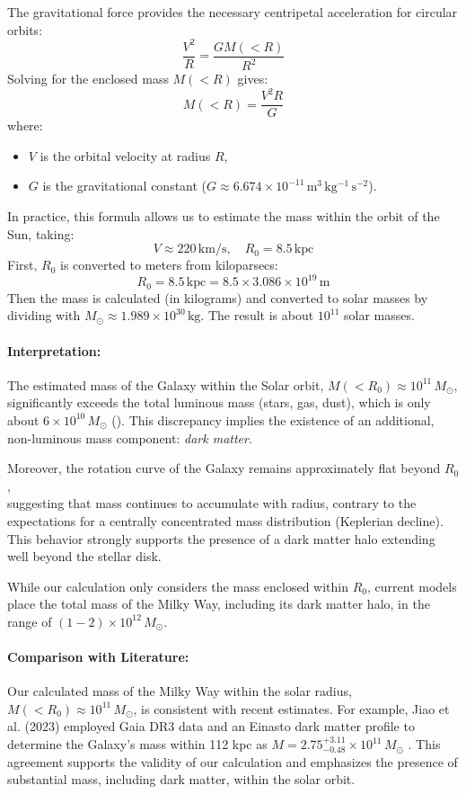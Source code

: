 \documentclass[12pt,a4paper]{article}
\begin{document}
The gravitational force provides the necessary centripetal acceleration for circular orbits:
\[
\frac{V^2}{R} = \frac{GM(<R)}{R^2}
\]
Solving for the enclosed mass $M(<R)$ gives:
\[
M(<R) = \frac{V^2 R}{G}
\]
where:
\begin{itemize}
  \item $V$ is the orbital velocity at radius $R$,
  \item $G$ is the gravitational constant ($G \approx 6.674 \times 10^{-11}\,\mathrm{m^3\,kg^{-1}\,s^{-2}}$).
\end{itemize}

In practice, this formula allows us to estimate the mass within the orbit of the Sun, taking:
\[
V \approx 220\,\mathrm{km/s}, \quad R_0 = 8.5\,\mathrm{kpc}
\]
First, $R_0$ is converted to meters from kiloparsecs:
\[
R_0 = 8.5\,\mathrm{kpc} = 8.5 \times 3.086 \times 10^{19}\,\mathrm{m}
\]
Then the mass is calculated (in kilograms) and converted to solar masses by dividing with $M_\odot \approx 1.989 \times 10^{30}\,\mathrm{kg}$. The result is about $10^{11}$ solar masses.

\paragraph{Interpretation:}
The estimated mass of the Galaxy within the Solar orbit, $M(<R_0) \approx 10^{11}\,M_\odot$, significantly exceeds the total luminous mass (stars, gas, dust), which is only about $6 \times 10^{10}\,M_\odot$ (\cite{lum_mass}). This discrepancy implies the existence of an additional, non-luminous mass component: \emph{dark matter}.

Moreover, the rotation curve of the Galaxy remains approximately flat beyond $R_0$, \\ suggesting that mass continues to accumulate with radius, contrary to the expectations for a centrally concentrated mass distribution (Keplerian decline). This behavior strongly supports the presence of a dark matter halo extending well beyond the stellar disk.

While our calculation only considers the mass enclosed within $R_0$, current models place the total mass of the Milky Way, including its dark matter halo, in the range of $(1{-}2) \times 10^{12}\,M_\odot$.

\paragraph{Comparison with Literature:}
Our calculated mass of the Milky Way within the solar radius, $M(<R_0) \approx 10^{11}\,M_\odot$, is consistent with recent estimates. For example, Jiao et al. (2023) employed Gaia DR3 data and an Einasto dark matter profile to determine the Galaxy's mass within 112 kpc as $M = 2.75^{+3.11}_{-0.48} \times 10^{11}\,M_\odot$ \cite{jiao2023}. This agreement supports the validity of our calculation and emphasizes the presence of substantial mass, including dark matter, within the solar orbit.
\end{document}
